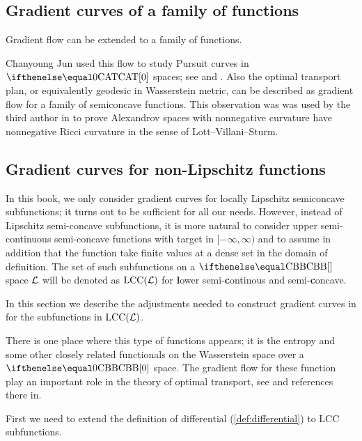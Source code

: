 \subsection*{Gradient curves of a family of functions}

Gradient flow can be extended to a family of functions.

Chanyoung Jun used this flow to study Pursuit curves in $\CAT0$ spaces;
see \cite{jun:thesis} and \cite{jun:grad}.
Also the optimal transport plan, or equivalently geodesic in Wasserstein metric, can be described as gradient flow for a family of semiconcave functions.
This observation was was used by the third author in \cite{petrunin:optimal} to prove Alexandrov spaces with nonnegative curvature have nonnegative Ricci curvature in the sense of Lott--Villani--Sturm.



\subsection*{Gradient curves for non-Lipschitz functions}\label{sec:non-lip}

\def\LSCSC{\mathrm{LCC}}%
\def\Wasserstein{\mathrm{P}_2}

In this book, we only consider gradient curves for locally Lipschitz semiconcave subfunctions;
it turns out to be sufficient for all our needs.
However, 
instead of Lipschitz semi-concave subfunctions,
it is more natural to consider upper semi-continuous semi-concave functions
with target in $[-\infty,\infty)$
and to assume in addition that 
the function take finite values at a dense set in the domain of definition.
The set of such subfunctions on a $\Alex{}$ space $\mathcal{L}$ will be denoted as 
$\LSCSC(\spc{L})$ for \textbf{l}ower semi-\textbf{c}ontinous and semi-\textbf{c}oncave.

In this section we describe the adjustments needed
to construct gradient curves in for the subfunctions in $\LSCSC(\spc{L})$.

There is one place where this type of functions appears;
it is the entropy and some other closely related functionals on the Wasserstein space over a  $\Alex0$ space.
The gradient flow for these function play an important role in the theory of optimal transport, see \cite{villani} and references there in. 


First we need to extend the definition of differential (\ref{def:differential}) to $\LSCSC$ subfunctions.

